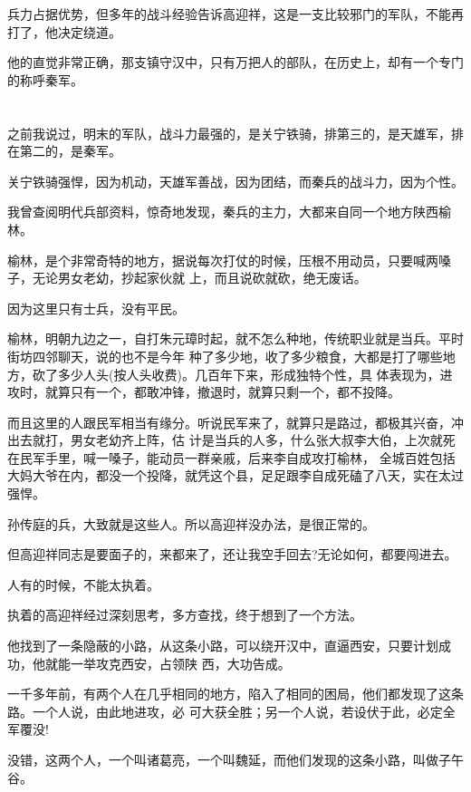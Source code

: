 \documentclass[11pt,a4paper,onecolumn]{article}
\begin{document}
兵力占据优势，但多年的战斗经验告诉高迎祥，这是一支比较邪门的军队，不能再打了，他决定绕道。

他的直觉非常正确，那支镇守汉中，只有万把人的部队，在历史上，却有一个专门的称呼\myrule 秦军。

\section[\thesection]{}

之前我说过，明末的军队，战斗力最强的，是关宁铁骑，排第三的，是天雄军，排在第二的，是秦军。

关宁铁骑强悍，因为机动，天雄军善战，因为团结，而秦兵的战斗力，因为个性。

我曾查阅明代兵部资料，惊奇地发现，秦兵的主力，大都来自同一个地方\myrule 陕西榆林。

榆林，是个非常奇特的地方，据说每次打仗的时候，压根不用动员，只要喊两嗓子，无论男女老幼，抄起家伙就
上，而且说砍就砍，绝无废话。

因为这里只有士兵，没有平民。

榆林，明朝九边之一，自打朱元璋时起，就不怎么种地，传统职业就是当兵。平时街坊四邻聊天，说的也不是今年
种了多少地，收了多少粮食，大都是打了哪些地方，砍了多少人头(按人头收费)。几百年下来，形成独特个性，具
体表现为，进攻时，就算只有一个，都敢冲锋，撤退时，就算只剩一个，都不投降。

而且这里的人跟民军相当有缘分。听说民军来了，就算只是路过，都极其兴奋，冲出去就打，男女老幼齐上阵，估
计是当兵的人多，什么张大叔李大伯，上次就死在民军手里，喊一嗓子，能动员一群亲戚，后来李自成攻打榆林，
全城百姓包括大妈大爷在内，都没一个投降，就凭这个县，足足跟李自成死磕了八天，实在太过强悍。

孙传庭的兵，大致就是这些人。所以高迎祥没办法，是很正常的。

但高迎祥同志是要面子的，来都来了，还让我空手回去?无论如何，都要闯进去。

人有的时候，不能太执着。

执着的高迎祥经过深刻思考，多方查找，终于想到了一个方法。

他找到了一条隐蔽的小路，从这条小路，可以绕开汉中，直逼西安，只要计划成功，他就能一举攻克西安，占领陕
西，大功告成。

一千多年前，有两个人在几乎相同的地方，陷入了相同的困局，他们都发现了这条路。一个人说，由此地进攻，必
可大获全胜；另一个人说，若设伏于此，必定全军覆没!

没错，这两个人，一个叫诸葛亮，一个叫魏延，而他们发现的这条小路，叫做子午谷。

\section[\thesection]{}
\end{document}

